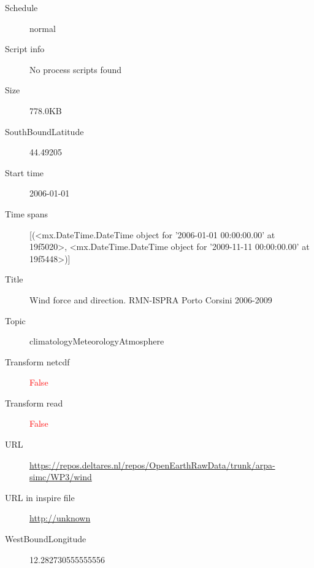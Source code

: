 \documentclass[9]{report}
\begin{document}
\begin{description}
\begin{verbatim}
\end{verbatim}
  \item[Schedule] normal
  \item[Script info] No process scripts found
  \item[Size] 778.0KB
  \item[SouthBoundLatitude] 44.49205
  \item[Start time] 2006-01-01
  \item[Time spans] [(<mx.DateTime.DateTime object for '2006-01-01 00:00:00.00' at 19f5020>, <mx.DateTime.DateTime object for '2009-11-11 00:00:00.00' at 19f5448>)]
  \item[Title]  Wind force and direction. RMN-ISPRA Porto Corsini 2006-2009 
  \item[Topic] climatologyMeteorologyAtmosphere
  \item[Transform netcdf] \textcolor{red}{False}
  \item[Transform read] \textcolor{red}{False}
  \item[URL] \href{https://repos.deltares.nl/repos/OpenEarthRawData/trunk/arpa-simc/WP3/wind}{https://repos.deltares.nl/repos/OpenEarthRawData/trunk/arpa-simc/WP3/wind}
  \item[URL in inspire file] \href{http://unknown}{http://unknown}
  \item[WestBoundLongitude] 12.282730555555556
\end{description}
\end{document}
